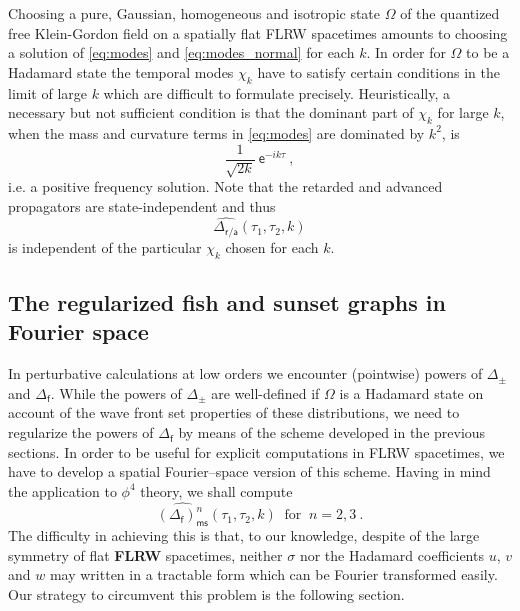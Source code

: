 \documentclass[11pt]{book}
\newcommand{\ms}{\mathsf{ms}}
\newcommand{\asf}{\mathsf{a}}
\newcommand{\esf}{\mathsf{e}}
\newcommand{\fsf}{\mathsf{f}}
\newcommand{\rsf}{\mathsf{r}}
\theoremstyle{break}
\begin{document}
%
Choosing a pure, Gaussian, homogeneous and isotropic state $\Omega$ of the quantized free Klein-Gordon field on a spatially flat FLRW spacetimes amounts to choosing a solution of \eqref{eq:modes} and \eqref{eq:modes_normal} for each $k$. In order for $\Omega$ to be a Hadamard state the temporal modes $\chi_k$ have to satisfy certain conditions in the limit of large $k$ which are difficult to formulate precisely. Heuristically, a necessary but not sufficient condition is that the dominant part of $\chi_k$ for large $k$, when the mass and curvature terms in \eqref{eq:modes} are dominated by $k^2$, is 
%
\begin{equation*}
\frac{1}{\sqrt{2k}} \ \esf^{-ik\tau} \ , 
\end{equation*}
%
i.e. a positive frequency solution. Note that the retarded and advanced propagators are state-independent and thus 
%
\begin{equation*}
\widehat{\Delta_{\rsf/\asf}}(\tau_1,\tau_2,k) 
\end{equation*}
%
is independent of the particular $\chi_k$ chosen for each $k$.


\subsection{The regularized fish and sunset graphs in Fourier space}
\label{p:SUNSET_FISH_FLWR}


In perturbative calculations at low orders we encounter (pointwise) powers of $\Delta_\pm$ and $\Delta_\fsf$. While the powers of $\Delta_\pm$ are well-defined if $\Omega$ is a Hadamard state on account of the wave front set properties of these distributions, we need to regularize the powers of $\Delta_\fsf$ by means of the scheme developed in the previous sections. In order to be useful for explicit computations in FLRW spacetimes, we have to develop a spatial Fourier--space version of this scheme. Having in mind the application to $\phi^4$ theory, we shall compute 
%
\begin{equation*}
\widehat{(\Delta_\fsf)^n_\ms}(\tau_1,\tau_2,k) \ \mbox{ for } \ n = 2 , 3 \ . 
\end{equation*}
%
The difficulty in achieving this is that, to our knowledge, despite of the large symmetry of flat \textbf{FLRW} spacetimes, neither $\sigma$ nor the Hadamard coefficients $u$, $v$ and $w$ may written in a tractable form which can be Fourier transformed easily. Our strategy to circumvent this problem is the following section.
\end{document}
